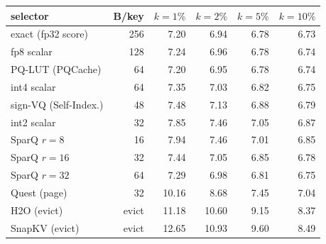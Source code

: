 \begin{tabular}{l r r r r r}
\toprule
selector & B/key & $k{=}1\%$ & $k{=}2\%$ & $k{=}5\%$ & $k{=}10\%$ \\
\midrule
exact (fp32 score) & 256 & 7.20 & 6.94 & 6.78 & 6.73 \\
fp8 scalar & 128 & 7.24 & 6.96 & 6.78 & 6.74 \\
PQ-LUT (PQCache) & 64 & 7.20 & 6.95 & 6.78 & 6.74 \\
int4 scalar & 64 & 7.35 & 7.03 & 6.82 & 6.75 \\
sign-VQ (Self-Index.) & 48 & 7.48 & 7.13 & 6.88 & 6.79 \\
int2 scalar & 32 & 7.85 & 7.46 & 7.05 & 6.87 \\
SparQ $r{=}8$ & 16 & 7.94 & 7.46 & 7.01 & 6.85 \\
SparQ $r{=}16$ & 32 & 7.44 & 7.05 & 6.85 & 6.78 \\
SparQ $r{=}32$ & 64 & 7.29 & 6.98 & 6.81 & 6.75 \\
Quest (page) & 32 & 10.16 & 8.68 & 7.45 & 7.04 \\
H2O (evict) & evict & 11.18 & 10.60 & 9.15 & 8.37 \\
SnapKV (evict) & evict & 12.65 & 10.93 & 9.60 & 8.49 \\
\bottomrule
\end{tabular}
